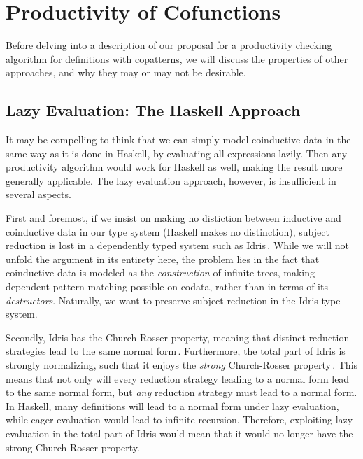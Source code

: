 \section{Productivity of Cofunctions}
\label{sec:productivity}

Before delving into a description of our proposal for a productivity checking algorithm for definitions with copatterns, we will discuss the properties of other approaches, and why they may or may not be desirable.

\subsection{Lazy Evaluation: The Haskell Approach}
It may be compelling to think that we can simply model coinductive data in the same way as it is done in Haskell, by evaluating all expressions lazily. Then any productivity algorithm would work for Haskell as well, making the result more generally applicable. The lazy evaluation approach, however, is insufficient in several aspects.

First and foremost, if we insist on making no distiction between inductive and coinductive data in our type system (Haskell makes no distinction), subject reduction is lost in a dependently typed system such as Idris\,\citep{Abel13Copatterns}. While we will not unfold the argument in its entirety here, the problem lies in the fact that coinductive data is modeled as the \emph{construction} of infinite trees, making dependent pattern matching possible on codata, rather than in terms of its \emph{destructors}. Naturally, we want to preserve subject reduction in the Idris type system.

Secondly, Idris has the Church-Rosser property, meaning that distinct reduction strategies lead to the same normal form\,\citep{BradyIdrisImpl13}. Furthermore, the total part of Idris is strongly normalizing, such that it enjoys the \emph{strong} Church-Rosser property\,\citep{Turner04totalfunctional}. This means that not only will every reduction strategy leading to a normal form lead to the same normal form, but \emph{any} reduction strategy must lead to a normal form. In Haskell, many definitions will lead to a normal form under lazy evaluation, while eager evaluation would lead to infinite recursion. Therefore, exploiting lazy evaluation in the total part of Idris would mean that it would no longer have the strong Church-Rosser property.

